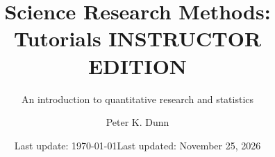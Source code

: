 \documentclass[
  11pt,
  a4paper,
  krantz2]{krantz}
\author{}
\date{\vspace{-2.5em}Last update: \today}
\title{Science Research Methods: Tutorials INSTRUCTOR EDITION}
\subtitle{An introduction to quantitative research and statistics}
\author{Peter K. Dunn}
\date{Last updated: November 25, 2026}
\makeatletter
\renewenvironment{quote}%
{\begin{kframe}}
{\end{kframe}}
\newenvironment{kframe}{%
\medskip{}
\setlength{\fboxsep}{.8em}
 \def\at@end@of@kframe{}%
 \ifinner\ifhmode%
  \def\at@end@of@kframe{\end{minipage}}%
  \begin{minipage}{\columnwidth}%
 \fi\fi%
 \def\FrameCommand##1{\hskip\@totalleftmargin \hskip-\fboxsep
 \colorbox{shadecolor}{##1}\hskip-\fboxsep
     \hskip-\linewidth \hskip-\@totalleftmargin \hskip\columnwidth}%
 \MakeFramed {\advance\hsize-\width
   \@totalleftmargin\z@ \linewidth\hsize
   \@setminipage}}%
 {\par\unskip\endMakeFramed%
 \at@end@of@kframe}
\renewenvironment{quote}
               {\list{}{\vspace{-0.5em}\begin{kframe}\small%
                        \rightmargin   \leftmargin
                        \parsep        \z@ \@plus\p@}%
                \item\relax}
               {\end{kframe}\endlist}
\let\oldmaketitle\maketitle
\makeatother
\begin{document}
\maketitle



\thispagestyle{empty}




\let\maketitle\oldmaketitle


\setlength{\abovedisplayskip}{-5pt}
\setlength{\abovedisplayshortskip}{-5pt}




\let\origexample=\example
\def\example{\begingroup\begin{quote}\setlength{\parskip}{3mm}\vspace{-7mm}\origexample}  
\let\origendexample=\endexample
\def\endexample{\origendexample\end{quote}\endgroup}


\let\origdefinition=\definition
\def\definition{\begingroup\begin{quote}\vspace{-5mm}\origdefinition}  
\let\origenddefinition=\enddefinition
\def\enddefinition{\origenddefinition\end{quote}\endgroup}
\end{document}
